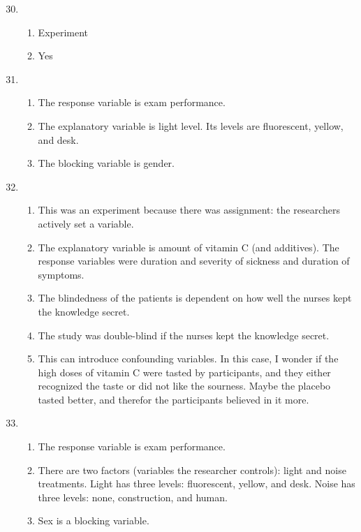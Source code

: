 \documentclass[12pt,letterpaper]{article}
\begin{document}
\begin{enumerate}
\setcounter{enumi}{29}
\item \begin{enumerate}
\item Experiment
\item Yes
\end{enumerate}

\item \begin{enumerate}
\item The response variable is exam performance.
\item The explanatory variable is light level. Its levels are fluorescent, yellow, and desk.
\item The blocking variable is gender.
\end{enumerate}

\item \begin{enumerate}
\item This was an experiment because there was assignment: the researchers actively set a variable.
\item The explanatory variable is amount of vitamin C (and additives). The response variables were duration and severity of sickness and duration of symptoms.
\item The blindedness of the patients is dependent on how well the nurses kept the knowledge secret.
\item The study was double-blind if the nurses kept the knowledge secret.
\item This can introduce confounding variables. In this case, I wonder if the high doses of vitamin C were tasted by participants, and they either recognized the taste or did not like the sourness. Maybe the placebo tasted better, and therefor the participants believed in it more.
\end{enumerate}

\item \begin{enumerate}
\item The response variable is exam performance.
\item There are two factors (variables the researcher controls): light and noise treatments. Light has three levels: fluorescent, yellow, and desk. Noise has three levels: none, construction, and human.
\item Sex is a blocking variable.
\end{enumerate}


\end{enumerate}
\end{document}
